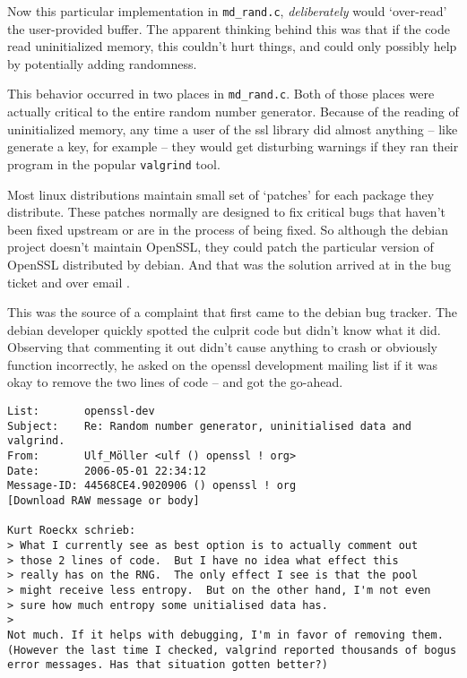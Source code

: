 \documentclass[conference]{IEEEtran}
\begin{document}
Now this particular implementation in \verb|md_rand.c|,
\emph{deliberately} would `over-read' the user-provided buffer. The
apparent thinking behind this was that if the code read uninitialized
memory, this couldn't hurt things, and could only possibly help by
potentially adding randomness.

This behavior occurred in two places in \verb|md_rand.c|. Both of
those places were actually critical to the entire random number
generator. Because of the reading of uninitialized memory, any time a
user of the ssl library did almost anything -- like generate a key,
for example -- they would get disturbing warnings if they ran their
program in the popular \verb|valgrind| tool.

Most linux distributions maintain small set of `patches' for each
package they distribute. These patches normally are designed to fix
critical bugs that haven't been fixed upstream or are in the process
of being fixed. So although the debian project doesn't maintain
OpenSSL, they could patch the particular version of OpenSSL
distributed by debian. And that was the solution arrived at in the bug
ticket and over email \cite{2}\cite{4}.

This was the source of a complaint that first came to the debian bug
tracker\cite{2}. The debian developer quickly spotted the culprit code
but didn't know what it did. Observing that commenting it out didn't
cause anything to crash or obviously function incorrectly, he asked on
the openssl development mailing list if it was okay to remove the two
lines of code -- and got the go-ahead.

\begin{displayquote}
\begin{verbatim}
List:       openssl-dev
Subject:    Re: Random number generator, uninitialised data and valgrind.
From:       Ulf_Möller <ulf () openssl ! org>
Date:       2006-05-01 22:34:12
Message-ID: 44568CE4.9020906 () openssl ! org
[Download RAW message or body]

Kurt Roeckx schrieb:
> What I currently see as best option is to actually comment out
> those 2 lines of code.  But I have no idea what effect this
> really has on the RNG.  The only effect I see is that the pool
> might receive less entropy.  But on the other hand, I'm not even
> sure how much entropy some unitialised data has.
>   
Not much. If it helps with debugging, I'm in favor of removing them. 
(However the last time I checked, valgrind reported thousands of bogus 
error messages. Has that situation gotten better?)
\end{verbatim}
\end{displayquote}
\cite{4}
\end{document}
